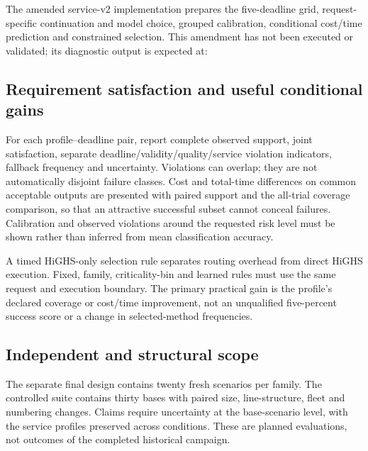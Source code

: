 The amended service-v2 implementation prepares the five-deadline grid,
request-specific continuation and model choice, grouped calibration,
conditional cost/time prediction and constrained selection. This amendment
has not been executed or validated; its diagnostic output is expected at:

\subsection{Requirement satisfaction and useful conditional gains}
For each profile--deadline pair, report complete observed support, joint satisfaction,
separate deadline/validity/quality/service violation indicators, fallback
frequency and uncertainty. Violations can overlap; they are not automatically
disjoint failure classes. Cost and total-time differences on common acceptable
outputs are presented with paired support and the all-trial coverage
comparison, so that an attractive successful subset cannot conceal failures.
Calibration and observed violations around the requested risk level must be
shown rather than inferred from mean classification accuracy.

A timed HiGHS-only selection rule separates routing overhead from direct
HiGHS execution. Fixed, family, criticality-bin and learned rules must use the
same request and execution boundary. The primary practical gain is the
profile's declared coverage or cost/time improvement, not an unqualified
five-percent success score or a change in selected-method frequencies.


\subsection{Independent and structural scope}
The separate final design contains twenty fresh scenarios per family.
The controlled suite contains thirty bases with paired size, line-structure,
fleet and numbering changes. Claims require uncertainty at the base-scenario
level, with the service profiles preserved across conditions. These are
planned evaluations, not outcomes of the completed historical campaign.

